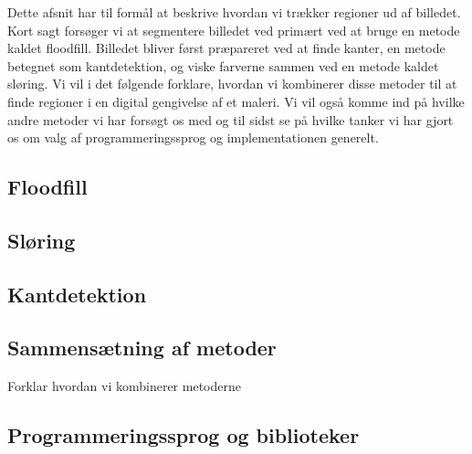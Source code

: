 {
{\sffamily Dette afsnit har til formål at beskrive hvordan vi trækker
regioner ud af billedet. Kort sagt forsøger vi at segmentere billedet
ved primært ved at bruge en metode kaldet floodfill. Billedet bliver
først præpareret ved at finde kanter, en metode betegnet som
kantdetektion, og viske farverne sammen ved en metode kaldet sløring. Vi
vil i det følgende forklare, hvordan vi kombinerer disse metoder til at
finde regioner i en digital gengivelse af et maleri. Vi vil også komme
ind på hvilke andre metoder vi har forsøgt os med og til sidst se på
hvilke tanker vi har gjort os om valg af programmeringssprog og
implementationen generelt.
}

\subsection{Floodfill}                                  %


\subsection{Sløring}                                    %


\subsection{Kantdetektion}                              %


\subsection{Sammensætning af metoder}
Forklar hvordan vi kombinerer metoderne

\subsection{Programmeringssprog og biblioteker}


}

